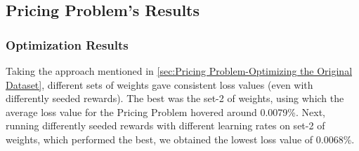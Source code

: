 \documentclass[12pt]{article}
\begin{document}
    \subsection{Pricing Problem's Results} \label{sec:Pricing Problem's Results}
    \subsubsection{Optimization Results} \label{sec:PriProbRes - Optimization}
    Taking the approach mentioned in \cref{sec:Pricing Problem-Optimizing the Original Dataset}, different sets of weights gave consistent loss values (even with differently seeded rewards). The best was the set-2 of weights, using which the average loss value for the Pricing Problem hovered around 0.0079\%. Next, running differently seeded rewards with different learning rates on set-2 of weights, which performed the best, we obtained the lowest loss value of 0.0068\%.
\end{document}

